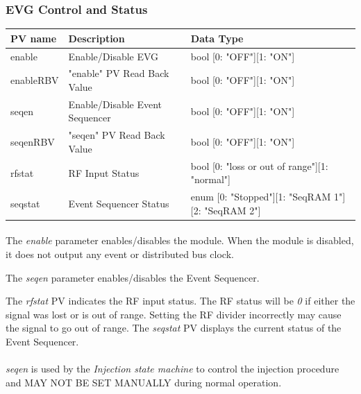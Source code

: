 \documentclass[openany]{article}
\begin{document}
		\subsubsection{EVG Control and Status}\label{pvgroup:evg-control-status}
			\begin{center}
			\begin{tabular}{| m{2.8cm} m{6cm} m{6cm} |}
			    \hline
			    \bfseries PV name & \bfseries Description & \bfseries Data Type \\ \hline
			    enable & Enable/Disable EVG	& bool [0: "OFF"][1: "ON"] \\ \hline
			    enableRBV & "enable" PV Read Back Value & bool [0: "OFF"][1: "ON"] \\ \hline
			    seqen & Enable/Disable Event Sequencer & bool [0: "OFF"][1: "ON"] \\ \hline
			    seqenRBV & "seqen" PV Read Back Value & bool [0: "OFF"][1: "ON"] \\ \hline
			    rfstat & RF Input Status & bool [0: "loss or out of range"][1: "normal"] \\ \hline
			    seqstat & Event Sequencer Status & enum [0: "Stopped"][1: "SeqRAM 1"][2: "SeqRAM 2"] \\ \hline
			\end{tabular}
			\end{center}

			\paragraph{} The \emph{enable} parameter enables/disables the module. When the module is disabled, it does not output any event or distributed bus clock.
			\par The \emph{seqen} parameter enables/disables the Event Sequencer.
			\par The \emph{rfstat} PV indicates the RF input status. The RF status will be \emph{0} if either the signal was lost or is out of range. Setting the RF divider incorrectly may cause the signal to go out of range. The \emph{seqstat} PV displays the current status of the Event Sequencer.
			\paragraph{} \emph{seqen} is used by the \emph{Injection state machine} to control the injection procedure and MAY NOT BE SET MANUALLY during normal operation.

			\bigskip
			\setlength{\fboxsep}{8pt}
\end{document}
